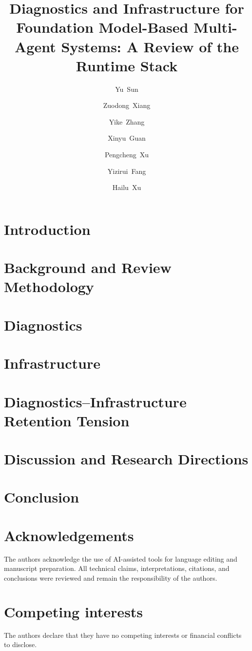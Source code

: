 \documentclass[review]{fcs}
\title{Diagnostics and Infrastructure for Foundation Model-Based Multi-Agent Systems: A Review of the Runtime Stack}
\author[1,+]{Yu~Sun}
\author[2]{Zuodong~Xiang}
\author[3]{Yike~Zhang}
\author[4]{Xinyu~Guan}
\author[5]{Pengcheng~Xu}
\author[6]{Yizirui~Fang}
\author[7]{Hailu~Xu}
\begin{document}
\section{Introduction}\label{sec:introduction}


\section{Background and Review Methodology}\label{sec:background}


\section{Diagnostics}\label{sec:diagnostics}


\section{Infrastructure}\label{sec:infrastructure}


\section{Diagnostics--Infrastructure Retention Tension}\label{sec:tension}


\section{Discussion and Research Directions}\label{sec:discussion}


\section{Conclusion}\label{sec:conclusion}


\fontsize{8.5pt}{10pt}\selectfont

\section*{Acknowledgements}
The authors acknowledge the use of AI-assisted tools for language editing and manuscript preparation. All technical claims, interpretations, citations, and conclusions were reviewed and remain the responsibility of the authors.

\section*{Competing interests}
The authors declare that they have no competing interests or financial conflicts to disclose.



\end{document}
